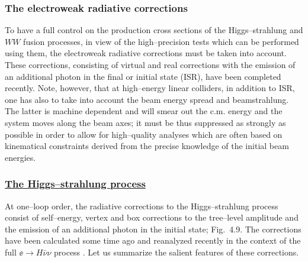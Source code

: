 \subsubsection{The electroweak radiative corrections}

To have a full control on the production cross sections of the Higgs--strahlung 
and $WW$ fusion processes, in view of the high--precision tests which can be 
performed using them, the electroweak radiative corrections must be taken 
into account. These corrections, consisting of virtual and real corrections 
with the emission of an additional photon in the final or initial state (ISR), 
have been completed recently. Note, however, that at high--energy linear 
colliders, in addition to ISR, one has also to take into account the beam 
energy spread and beamstrahlung. The latter is machine dependent and will 
smear out the c.m. energy and the system moves along the beam axes; it must
be thus suppressed  as strongly as possible in order to allow for high--quality
analyses which are often based on kinematical constraints derived 
from the precise knowledge of the initial beam energies. 

\subsubsection*{\underline{The Higgs--strahlung process}}

At one--loop order, the radiative corrections to the Higgs--strahlung 
process consist of  self--energy, vertex and box corrections to the tree--level
amplitude and the emission of an additional photon in the initial state;
Fig.~4.9.  The corrections have been calculated some time ago \cite{RCHZ} and
reanalyzed recently in the context of the full $\ee \to H\bar{\nu} \nu$ 
process \cite{RCWW1,RCWW2,RCWW3}. Let us summarize the salient features of these
corrections.

